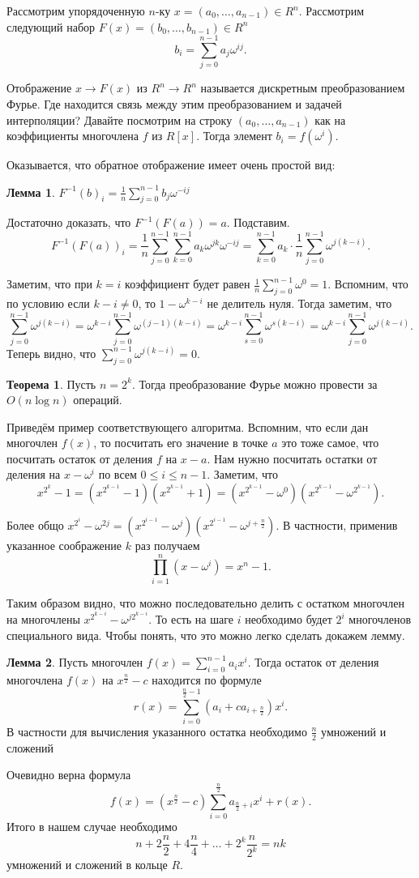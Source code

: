 \documentclass[10pt,a4paper,oneside]{book}
\theoremstyle{definition}
\newtheorem{thm}{Теорема}
\newtheorem{lem}{Лемма}
\def\thrm{\begin{thm}}
\def\ethrm{\end{thm}}
\def\lm{\begin{lem}}
\def\elm{\end{lem}}
\begin{document}
Рассмотрим упорядоченную $n$-ку $x=(a_0,\dots,a_{n-1})\in R^n$. Рассмотрим следующий набор $F(x)=(b_0,\dots,b_{n-1})\in R^n$ 
$$b_i=\sum_{j=0}^{n-1} a_j \omega^{ij}.$$

Отображение $x \to F(x)$ из $ R^n \to R^n$ называется дискретным преобразованием Фурье. Где находится связь между этим преобразованием и задачей интерполяции? Давайте посмотрим на строку $(a_0,\dots,a_{n-1})$ как на коэффициенты многочлена $f$ из $R[x]$. Тогда элемент $b_i=f(\omega^i)$.

Оказывается, что обратное отображение имеет очень простой вид: 

\lm $F^{-1}(b)_i=\frac{1}{n}\sum_{j=0}^{n-1} b_j \omega^{-ij}$
\elm 
\proof Достаточно доказать, что $F^{-1}(F(a))=a$. Подставим.
$$F^{-1}(F(a))_i=\frac{1}{n}\sum_{j=0}^{n-1} \sum_{k=0}^{n-1} a_k \omega^{jk} \omega^{-ij}=\sum_{k=0}^{n-1} a_k \cdot \frac{1}{n}\sum_{j=0}^{n-1} \omega^{j(k-i)}.$$

Заметим, что при $k=i$ коэффициент будет равен $\frac{1}{n}\sum_{j=0}^{n-1} \omega^{0}=1$. Вспомним, что по условию если  $k-i\neq 0$, то  $1-\omega^{k-i}$ не делитель нуля. Тогда заметим, что 
$$\sum_{j=0}^{n-1}\omega^{j(k-i)}=\omega^{k-i}\sum_{j=0}^{n-1} \omega^{(j-1)(k-i)}=\omega^{k-i}\sum_{s=0}^{n-1} \omega^{s(k-i)}=\omega^{k-i}\sum_{j=0}^{n-1} \omega^{j(k-i)}.$$
Теперь видно, что $\sum_{j=0}^{n-1}\omega^{j(k-i)}=0$.
\endproof

\thrm Пусть $n=2^k$. Тогда преобразование Фурье можно провести за $O(n\log n)$ операций.
\ethrm
\proof Приведём пример соответствующего алгоритма. Вспомним, что если дан многочлен $f(x)$, то посчитать его значение в точке $a$ это тоже самое, что посчитать остаток от деления $f$ на $x-a$. Нам нужно посчитать остатки от деления на $x-\omega^i$ по всем $0\leq i\leq n-1$. Заметим, что  
$$x^{2^k}-1=(x^{2^{k-1}}-1)(x^{2^{k-1}}+1)=(x^{2^{k-1}}-\omega^0)(x^{2^{k-1}}-\omega^{2^{k-1}}).$$

Более общо $x^{2^i}-\omega^{2j}=(x^{2^{i-1}}-\omega^j)(x^{2^{i-1}}-\omega^{j+\frac{n}{2}})$. В частности, применив указанное соображение $k$ раз получаем  
$$\prod_{i=1}^n(x-\omega^i)=x^n-1.$$

Таким образом видно, что можно последовательно делить с остатком многочлен на многочлены $x^{2^{k-i}}-\omega^{j2^{k-i}}$. То есть на шаге $i$ необходимо будет $2^{i}$ многочленов специального вида. Чтобы понять, что это можно легко сделать докажем лемму. 

\lm Пусть многочлен $f(x)=\sum_{i=0}^{n-1} a_ix^i$. Тогда остаток от деления многочлена $f(x)$ на $x^{\frac{n}{2}}-c$ находится по формуле
$$r(x)=\sum_{i=0}^{\frac{n}{2}-1}(a_i+ca_{i+\frac{n}{2}})x^{i}. $$
В частности для вычисления указанного остатка необходимо $\frac{n}{2}$ умножений и сложений
\elm 
\proof Очевидно верна формула
$$f(x)=(x^{\frac{n}{2}}-c)\sum_{i=0}^{\frac{n}{2}} a_{\frac{n}{2}+i}x^i+r(x).$$
\endproof
 Итого в нашем случае необходимо 
$$n+2\frac{n}{2}+4\frac{n}{4}+\dots+2^k\frac{n}{2^k}=nk$$
умножений и сложений  в кольце $R$.
\endproof
\end{document}
